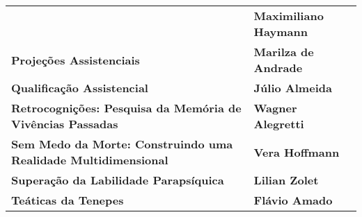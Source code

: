 \documentclass[
]{article}
\begin{document}
\begin{longtable}[]{@{}
  >{\raggedright\arraybackslash}p{}
  >{\raggedright\arraybackslash}p{}@{}}
\begin{minipage}[b]{\linewidth}
\end{minipage} & \begin{minipage}[b]{\linewidth}\raggedright
\textbf{Maximiliano Haymann}
\end{minipage} \\
\begin{minipage}[b]{\linewidth}\raggedright
\textbf{Projeções Assistenciais}
\end{minipage} & \begin{minipage}[b]{\linewidth}\raggedright
\textbf{Marilza de Andrade}
\end{minipage} \\
\begin{minipage}[b]{\linewidth}\raggedright
\textbf{Qualificação Assistencial}
\end{minipage} & \begin{minipage}[b]{\linewidth}\raggedright
\textbf{Júlio Almeida}
\end{minipage} \\
\begin{minipage}[b]{\linewidth}\raggedright
\textbf{Retrocognições: Pesquisa da Memória de Vivências Passadas}
\end{minipage} & \begin{minipage}[b]{\linewidth}\raggedright
\textbf{Wagner Alegretti}
\end{minipage} \\
\begin{minipage}[b]{\linewidth}\raggedright
\textbf{Sem Medo da Morte: Construindo uma Realidade Multidimensional}
\end{minipage} & \begin{minipage}[b]{\linewidth}\raggedright
\textbf{Vera Hoffmann}
\end{minipage} \\
\begin{minipage}[b]{\linewidth}\raggedright
\textbf{Superação da Labilidade Parapsíquica}
\end{minipage} & \begin{minipage}[b]{\linewidth}\raggedright
\textbf{Lilian Zolet}
\end{minipage} \\
\begin{minipage}[b]{\linewidth}\raggedright
\textbf{Teáticas da Tenepes}
\end{minipage} & \begin{minipage}[b]{\linewidth}\raggedright
\textbf{Flávio Amado}
\end{minipage} \\

\end{longtable}
\end{document}
